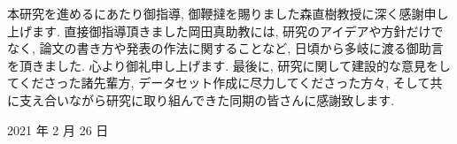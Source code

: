 \newpage
\changeindent{0cm}
\acknowledgements
\changeindent{2cm}

本研究を進めるにあたり御指導, 御鞭撻を賜りました森直樹教授に深く感謝申し上げます.
直接御指導頂きました岡田真助教には, 研究のアイデアや方針だけでなく,
論文の書き方や発表の作法に関することなど, 日頃から多岐に渡る御助言を頂きました.
心より御礼申し上げます.
最後に, 研究に関して建設的な意見をしてくださった諸先輩方, データセット作成に尽力してくださった方々, そして共に支え合いながら研究に取り組んできた同期の皆さんに感謝致します.

\begin{flushright}
  2021 年 2 月 26 日
\end{flushright}
